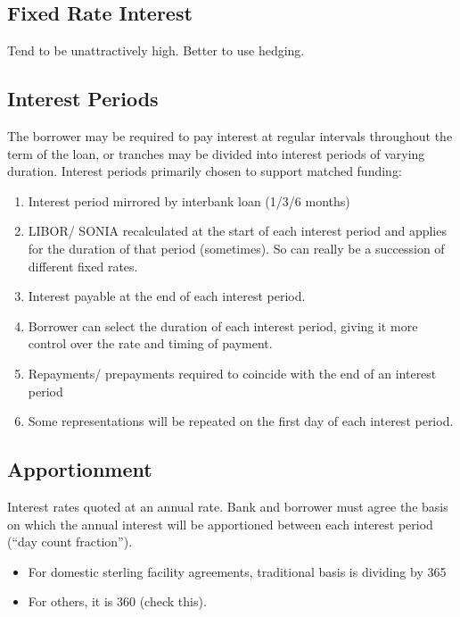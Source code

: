 \documentclass[
]{article}
\providecommand{\tightlist}{%
  \setlength{\itemsep}{0pt}\setlength{\parskip}{0pt}}
\begin{document}
\hypertarget{fixed-rate-interest}{%
\subsection{Fixed Rate Interest}\label{fixed-rate-interest}}

Tend to be unattractively high. Better to use hedging.

\hypertarget{interest-periods}{%
\subsection{Interest Periods}\label{interest-periods}}

The borrower may be required to pay interest at regular intervals
throughout the term of the loan, or tranches may be divided into
interest periods of varying duration. Interest periods primarily chosen
to support matched funding:

\begin{enumerate}
\tightlist
\item
  Interest period mirrored by interbank loan (1/3/6 months)
\item
  LIBOR/ SONIA recalculated at the start of each interest period and
  applies for the duration of that period (sometimes). So can really be
  a succession of different fixed rates.
\item
  Interest payable at the end of each interest period.
\item
  Borrower can select the duration of each interest period, giving it
  more control over the rate and timing of payment.
\item
  Repayments/ prepayments required to coincide with the end of an
  interest period
\item
  Some representations will be repeated on the first day of each
  interest period.
\end{enumerate}

\hypertarget{apportionment}{%
\subsection{Apportionment}\label{apportionment}}

Interest rates quoted at an annual rate. Bank and borrower must agree
the basis on which the annual interest will be apportioned between each
interest period (``day count fraction'').

\begin{itemize}
\tightlist
\item
  For domestic sterling facility agreements, traditional basis is
  dividing by 365
\item
  For others, it is 360 (check this).
\end{itemize}
\end{document}
